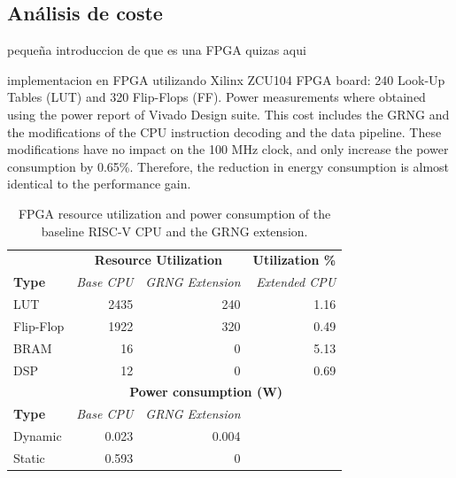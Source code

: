 \subsection{Análisis de coste}
\todo pequeña introduccion de que es una FPGA quizas aqui

implementacion en FPGA utilizando Xilinx ZCU104 FPGA board: 240 Look-Up Tables (LUT) and 320 Flip-Flops (FF). Power measurements where obtained using the power report of Vivado Design suite. %
This cost includes the GRNG and the modifications of the CPU instruction decoding and the data pipeline. These modifications have no impact on the 100 MHz clock, and only increase the power consumption by 0.65\%. Therefore, the reduction in energy consumption is almost identical to the performance gain. 

\begin{table}[ht]
\centering
\caption{FPGA resource utilization and power consumption of the baseline RISC-V CPU and the GRNG extension.}
\label{tab:riscv_fpga_utilization}
\begin{tabular}{lrrr}
\hline
& \multicolumn{2}{c}{\textbf{Resource Utilization}} & \textbf{Utilization \%}\\
\textbf{Type} & \textit{Base CPU} & \textit{GRNG Extension} & \textit{Extended CPU}\\ \hline
LUT	        & 2435 & 240 & 1.16 \\
Flip-Flop	& 1922 & 320 & 0.49 \\
BRAM	    & 16   & 0 & 5.13 \\
DSP	        & 12   & 0 & 0.69 \\ \hline
 & \multicolumn{3}{c}{\textbf{Power consumption (W)}} \\
\textbf{Type} & \textit{Base CPU} & \textit{GRNG Extension} \\ \hline
Dynamic & 0.023 & 0.004 \\
Static & 0.593 & 0 \\ \hline
\end{tabular}
\end{table}

